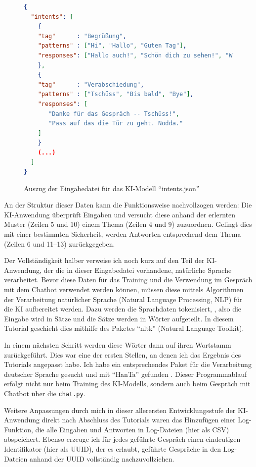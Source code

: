 \documentclass[12pt,oneside,titlepage,listof=totoc,bibliography=totoc]{scrartcl}
\newcommand{\code}[1]{\colorbox{code-gray}{\texttt{#1}}}
\begin{document}
\begin{figure}[H] \caption{Auszug der Eingabedatei für das KI-Modell \enquote{intents.json}}
\label{fig:code-intents.json} \begin{lstlisting}[language=json]
{
  "intents": [
    {
    "tag"      : "Begrüßung",
    "patterns" : ["Hi", "Hallo", "Guten Tag"],
    "responses": ["Hallo auch!", "Schön dich zu sehen!", "Willkommen!"]
    },
    {
    "tag"      : "Verabschiedung",
    "patterns" : ["Tschüss", "Bis bald", "Bye"],
    "responses": [
       "Danke für das Gespräch -- Tschüss!",
       "Pass auf das die Tür zu geht. Nodda."
    ]
    }
    (...)
  ]
}
\end{lstlisting} \end{figure}

An der Struktur dieser Daten kann die Funktionsweise nachvollzogen werden: Die KI-Anwendung überprüft Eingaben und versucht diese anhand der erlernten Muster (Zeilen 5 und 10) einem Thema (Zeilen 4 und 9) zuzuordnen. Gelingt dies mit einer bestimmten Sicherheit, werden Antworten entsprechend dem Thema (Zeilen 6 und 11--13) zurückgegeben.

Der Vollständigkeit halber verweise ich noch kurz auf den Teil der KI-Anwendung, der die in dieser Eingabedatei vorhandene, natürliche Sprache verarbeitet. Bevor diese Daten für das Training und die Verwendung im Gespräch mit dem Chatbot verwendet werden können, müssen diese mittels Algorithmen der Verarbeitung natürlicher Sprache (Natural Language Processing, NLP) für die KI aufbereitet werden. Dazu werden die Sprachdaten tokenisiert, \dah, also die Eingabe wird in Sätze und die Sätze werden in Wörter aufgeteilt. In diesem Tutorial geschieht dies mithilfe des Paketes \enquote{nltk} (Natural Language Toolkit).

In einem nächsten Schritt werden diese Wörter dann auf ihren Wortstamm zurückgeführt. Dies war eine der ersten Stellen, an denen ich das Ergebnis des Tutorials angepasst habe. Ich habe ein entsprechendes Paket für die Verarbeitung deutscher Sprache gesucht und mit \enquote{HanTa} gefunden \parencite[]{57-wartena2019probabilistic}. Dieser Programmablauf erfolgt nicht nur beim Training des KI-Modells, sondern auch beim Gespräch mit Chatbot über die \code{chat.py}.

Weitere Anpassungen durch mich in dieser allerersten Entwicklungsstufe der KI-Anwendung direkt nach Abschluss des Tutorials waren das Hinzufügen einer Log-Funktion, die alle Eingaben und Antworten in Log-Dateien (hier als CSV) abspeichert. Ebenso erzeuge ich für jedes geführte Gespräch einen eindeutigen Identifikator (hier als \ac{UUID}), der es erlaubt, geführte Gespräche in den Log-Dateien anhand der \ac{UUID} vollständig nachzuvollziehen. 
\end{document}
